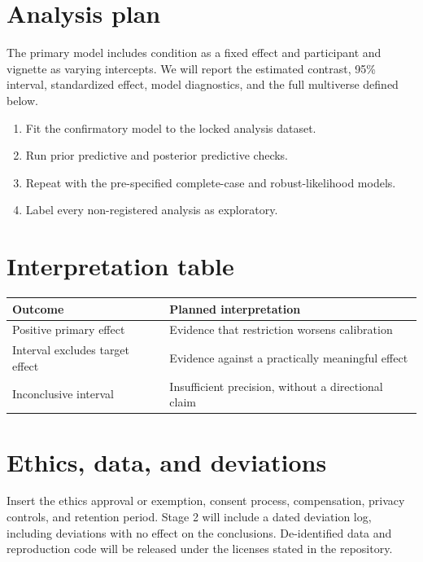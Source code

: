 \documentclass[11pt]{article}
\begin{document}
\section{Analysis plan}
The primary model includes condition as a fixed effect and participant and
vignette as varying intercepts. We will report the estimated contrast, 95\%
interval, standardized effect, model diagnostics, and the full multiverse
defined below.

\begin{enumerate}[leftmargin=1.5em,itemsep=0.15em]
\item Fit the confirmatory model to the locked analysis dataset.
\item Run prior predictive and posterior predictive checks.
\item Repeat with the pre-specified complete-case and robust-likelihood models.
\item Label every non-registered analysis as exploratory.
\end{enumerate}

\section{Interpretation table}
\begin{tabularx}{\textwidth}{@{}lX@{}}
\toprule
\textbf{Outcome} & \textbf{Planned interpretation} \\
\midrule
Positive primary effect & Evidence that restriction worsens calibration \\
Interval excludes target effect & Evidence against a practically meaningful effect \\
Inconclusive interval & Insufficient precision, without a directional claim \\
\bottomrule
\end{tabularx}

\section{Ethics, data, and deviations}
Insert the ethics approval or exemption, consent process, compensation, privacy
controls, and retention period. Stage 2 will include a dated deviation log,
including deviations with no effect on the conclusions. De-identified data and
reproduction code will be released under the licenses stated in the repository.
\end{document}
